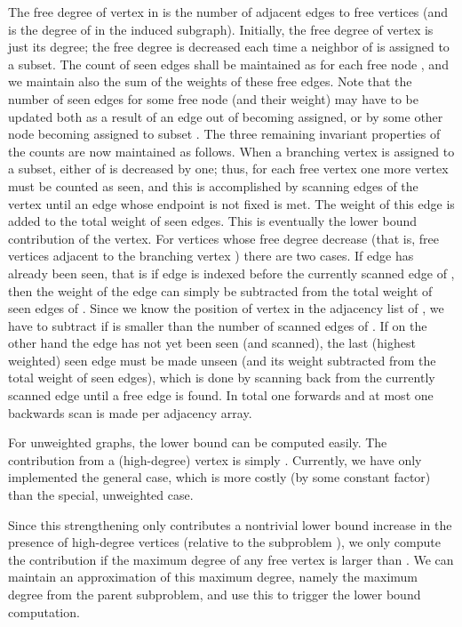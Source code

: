 \documentclass[a4paper,11pt]{article}
\begin{document}
The free degree  of vertex  in  is the number
of adjacent edges to free vertices (and is the degree of  in the
induced subgraph). Initially, the free degree of vertex  is just
its degree; the free degree is decreased each time a neighbor of 
is assigned to a subset. The count of seen edges shall be maintained
as  for each free node , and we
maintain also the sum of the weights of these free edges. Note that
the number of seen edges for some free node  (and their weight) may
have to be updated both as a result of an edge  out of 
becoming assigned, or by some other node becoming assigned to subset
. The three remaining invariant properties of the counts are now
maintained as follows. When a branching vertex  is assigned to a
subset, either of  is decreased by one; thus, for each free
vertex one more vertex must be counted as seen, and this is
accomplished by scanning edges of the vertex until an edge whose
endpoint is not fixed is met. The weight of this edge is added to the
total weight of seen edges. This is eventually the lower bound
contribution of the vertex. For vertices whose free degree 
decrease (that is, free vertices adjacent to the branching vertex )
there are two cases. If edge  has already been seen, that is if
edge  is indexed before the currently scanned edge of , then
the weight of the edge can simply be subtracted from the total weight
of seen edges of .  Since we know the position  of vertex  in
the adjacency list of , we have to subtract if  is smaller than
the number of scanned edges of . If on the other hand the edge
 has not yet been seen (and scanned), the last (highest
weighted) seen edge must be made unseen (and its weight subtracted
from the total weight of seen edges), which is done by scanning back
from the currently scanned edge until a free edge is found. In total
one forwards and at most one backwards scan is made per adjacency array.

For unweighted graphs, the lower bound can be computed easily. The
contribution from a (high-degree) vertex is simply
. Currently, we have only implemented the
general case, which is more costly (by some constant factor) than the
special, unweighted case.

Since this strengthening only contributes a nontrivial lower bound
increase in the presence of high-degree vertices (relative to the
subproblem ), we only compute the contribution if the
maximum degree  of any free vertex  is larger than
. We can maintain an approximation of this maximum degree, namely
the maximum degree from the parent subproblem, and use this to trigger
the lower bound computation.
\end{document}
